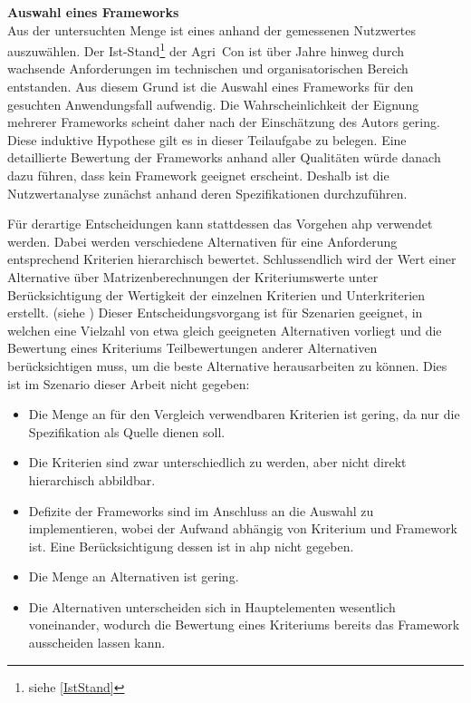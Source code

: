 \textbf{Auswahl eines Frameworks}\\
Aus der untersuchten Menge ist eines anhand der gemessenen Nutzwertes auszuwählen.
Der Ist-Stand\footnote{siehe \ref{IstStand}} der Agri~Con ist über Jahre hinweg durch wachsende  Anforderungen im technischen und organisatorischen Bereich entstanden.
Aus diesem Grund ist die Auswahl eines Frameworks für den gesuchten Anwendungsfall aufwendig.
Die Wahrscheinlichkeit der Eignung mehrerer Frameworks scheint daher nach der Einschätzung des Autors gering.
Diese induktive Hypothese gilt es in dieser Teilaufgabe zu belegen.
Eine detaillierte Bewertung der Frameworks anhand aller Qualitäten würde danach dazu führen, dass kein Framework geeignet erscheint.
Deshalb ist die Nutzwertanalyse zunächst anhand deren Spezifikationen durchzuführen.

Für derartige Entscheidungen kann stattdessen das Vorgehen \Gls{ahp} verwendet werden.
Dabei werden verschiedene Alternativen für eine Anforderung entsprechend Kriterien hierarchisch bewertet.
Schlussendlich wird der Wert einer Alternative über Matrizenberechnungen der Kriteriumswerte unter Berücksichtigung der Wertigkeit der einzelnen Kriterien und Unterkriterien erstellt. (siehe \cite{website:ahp-gaul})
Dieser Entscheidungsvorgang ist für Szenarien geeignet, in welchen eine Vielzahl von etwa gleich geeigneten Alternativen vorliegt und die Bewertung eines Kriteriums Teilbewertungen anderer Alternativen berücksichtigen muss, um die beste Alternative herausarbeiten zu können.
Dies ist im Szenario dieser Arbeit nicht gegeben:
\begin{itemize}
\item Die Menge an für den Vergleich verwendbaren Kriterien ist gering, da nur die Spezifikation als Quelle dienen soll.
\item Die Kriterien sind zwar unterschiedlich zu werden, aber nicht direkt hierarchisch abbildbar.
\item Defizite der Frameworks sind im Anschluss an die Auswahl  zu implementieren, wobei der Aufwand abhängig von Kriterium und Framework ist. Eine Berücksichtigung dessen ist in \Gls{ahp} nicht gegeben.
\item Die Menge an Alternativen ist gering.
\item Die Alternativen unterscheiden sich in Hauptelementen wesentlich voneinander, wodurch die Bewertung eines Kriteriums bereits das Framework ausscheiden lassen kann.
\end{itemize}

